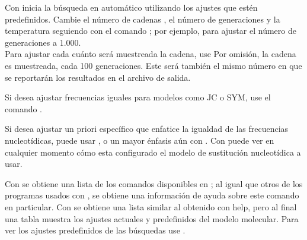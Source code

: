 Con \cmd{}  inicia la b\'usqueda en autom\'atico utilizando los ajustes que est\'en predefinidos. Cambie el n\'umero de cadenas , el n\'umero de generaciones  y la temperatura  seguiendo con el comando ;
por ejemplo,  para ajustar el n\'umero de generaciones a 1.000.\\
Para ajustar cada cu\'anto ser\'a muestreada la cadena, use 
Por omisi\'on, la cadena es muestreada, cada 100 generaciones. Este ser\'a tambi\'en el mismo n\'umero en que se reportar\'an los resultados en el archivo de salida.

Si  desea ajustar frecuencias iguales para modelos como  JC o SYM, use el comando . 

Si desea ajustar un priori espec\'ifico que enfatice la igualdad de las frecuencias nucleot\'idicas,  puede usar , o un mayor \'enfasis a\'un con . Con  puede ver en cualquier momento c\'omo esta configurado el modelo de sustituci\'on nucleot\'idica a usar.

Con  se obtiene una lista de los comandos disponibles en ; al igual que otros de los programas usados con , se obtiene una informaci\'on de ayuda sobre este comando en particular. Con  se obtiene una lista similar al obtenido con help, pero al final una tabla muestra los ajustes actuales y predefinidos del modelo molecular. Para ver los ajustes predefinidos de las b\'usquedas use . 


